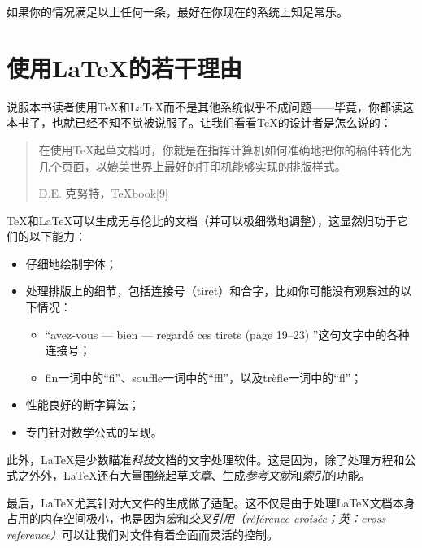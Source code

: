 如果你的情况满足以上任何一条，最好在你现在的系统上知足常乐。

\section*{使用\LaTeX 的若干理由}

说服本书读者使用\TeX 和\LaTeX 而不是其他系统似乎不成问题——毕竟，你都读这本书了，也就已经不知不觉被说服了。让我们看看\TeX 的设计者是怎么说的：

\begin{quote}
    在使用\TeX 起草文档时，你就是在指挥计算机如何准确地把你的稿件转化为几个页面，以媲美世界上最好的打印机能够实现的排版样式。
    
    \hfill D.E. 克努特，\TeX book[9]
\end{quote}

\TeX 和\LaTeX 可以生成无与伦比的文档（并可以极细微地调整），这显然归功于它们的以下能力：

\begin{itemize}
    \item 仔细地绘制字体；
    \item 处理排版上的细节，包括连接号（tiret）和合字，比如你可能没有观察过的以下情况：
    \begin{itemize}
        \item “avez-vous --- bien --- regardé ces tirets (page 19--23) ”这句文字中的各种连接号；
        \item fin一词中的“f\/i”、souffle一词中的“f\/f\/l”，以及trèfle一词中的“f\/l”；
    \end{itemize}
    \item 性能良好的断字算法；
    \item 专门针对数学公式的呈现。
\end{itemize}

此外，\LaTeX 是少数瞄准\emph{科技}文档的文字处理软件。这是因为，除了处理方程和公式之外外，\LaTeX 还有大量围绕起草\emph{文章}、生成\emph{参考文献}和\emph{索引}的功能。

最后，\LaTeX 尤其针对大文件的生成做了适配。这不仅是由于处理\LaTeX 文档本身占用的内存空间极小，也是因为\emph{宏}和\emph{交叉引用（référence croisée；英：cross reference）}可以让我们对文件有着全面而灵活的控制。

